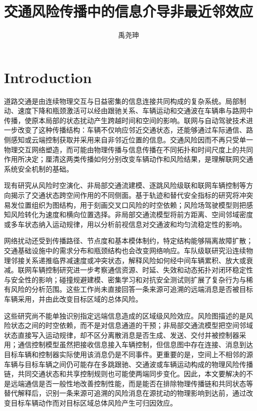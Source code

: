 \documentclass[10pt,a4paper,twocolumn]{article}
\title{交通风险传播中的信息介导非最近邻效应}
\author{禹尧珅}
\date{}
\begin{document}
\maketitle

\begin{abstract}
\end{abstract}

\section*{Introduction}
道路交通是由连续物理交互与日益密集的信息连接共同构成的复杂系统。局部制动、速度下降和瓶颈激活可以经由跟驰关系、车辆运动和交通波在车辆串与路网中传播，使原本局部的状态扰动产生跨越时间和空间的影响\cite{saberi2020contagion}\cite{duan2023bottlenecks}。联网与自动驾驶技术进一步改变了这种传播结构：车辆不仅响应邻近交通状态，还能够通过车际通信、路侧感知或云端控制获取并采用来自非邻近位置的信息\cite{wang2025delays}。交通风险因而不再只受单一物理交互网络塑造，而可能由物理传播与信息传播在不同拓扑和时间尺度上的共同作用所决定；厘清这两类传播如何分别改变车辆动作和风险结果，是理解联网交通系统安全机制的基础。

现有研究从风险时空演化、非局部交通流建模、逐跳风险级联和联网车辆控制等方向揭示了交通状态跨空间作用的不同侧面。基于轨迹和替代安全指标的研究将冲突易发位置组织为图结构，用于刻画交叉口风险的时空依赖\cite{wang2024conflict}；风险场驾驶模型则把感知风险转化为速度和横向位置选择\cite{kolekar2020risk}。非局部交通流模型将前方距离、空间邻域密度或多车状态纳入运动规律，用以分析前视信息对交通波和均匀流稳定性的影响\cite{sun2020lookahead}\cite{huang2022nonlocal}。

网络扰动还受到传播路径、节点度和基本模体制约，特定结构能够隔离故障扩散；交通基础设施中的需求分布和瓶颈结构也会改变网络响应\cite{bao2022motifs}\cite{kaiser2021isolators}\cite{hamedmoghadam2021percolation}。车队级联研究沿连续物理邻接关系递推临界减速度或冲突状态，解释风险如何经中间车辆累积、放大或衰减\cite{luo2026crm}。联网车辆控制研究进一步考察通信资源、时延、失效和动态拓扑对闭环稳定性与安全性的影响\cite{razzaghpour2023controlaware}\cite{wang2024topology}；碰撞规避建模、密集学习和对抗安全测试则扩展了复杂行为与稀有风险的分析范围\cite{schumann2026collision,feng2026dense,xu2026ga2ad}。这些工作尚未直接回答一条来源可追溯的远端消息是否被目标车辆采用，并由此改变目标区域的总体风险。

这些研究尚不能单独识别指定远端信息造成的区域级风险效应。风险图描述的是风险状态之间的时空依赖，而不是对信息通道的干预；非局部交通流模型把空间邻域状态直接写入运动规律，却不区分离散消息是否生成、发送、交付并被控制器采用；通信控制模型虽然把接收信息接入车辆控制，但信息图中存在连接、消息到达目标车辆和控制器实际使用该消息仍是不同事件。更重要的是，空间上不相邻的源车辆与目标车辆之间仍可能存在多跳跟驰、交通波或车辆运动构成的物理风险传播链，共同交通状态和共享控制规则也可能使两端同步变化。因此，本文要解决的不是远端通信是否一般性地改善控制性能，而是能否在排除物理传播链和共同状态等替代解释后，识别一条来源可追溯的风险消息在源扰动的物理影响到达前，通过改变目标车辆动作而对目标区域总体风险产生可归因效应。
\end{document}
